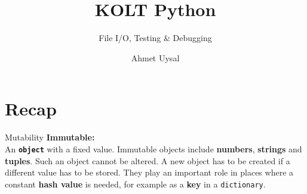 
\usepackage{../KU-Beamer-Template/style/koc} 
\usepackage{minted}
\usepackage{upquote}
\usepackage{graphicx}
\usepackage{tikz}
\usetikzlibrary{shapes.symbols,positioning, chains}

\title{KOLT Python}
\subtitle{File I/O, Testing \& Debugging} 
\date{}
\author{Ahmet Uysal}




    \maketitle


    \section{Recap}

    \begin{frame}{Mutability}
        \huge
        \textbf{Immutable:}\\
        \LARGE
        An \texttt{\textbf{object}} with a fixed value.
         Immutable objects include \textbf{numbers}, \textbf{strings} and \textbf{tuples}. Such an object cannot be altered.
         A new object has to be created if a different value has to be stored.
         They play an important role in places where a constant \textbf{hash value} is needed, for example as a \textbf{key} in a \texttt{dictionary}.
        \inputminted[frame=single,framesep=2pt]{python3}{../Lecture5/code-examples/value_update.py}
    \end{frame}

